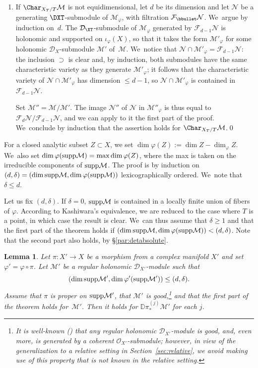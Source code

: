 \documentclass{amsart}
\theoremstyle{plain}
\numberwithin{theorem}{section}
\newtheorem{lemma}[theorem]{Lemma}
\theoremstyle{definition}
\theoremstyle{remark}
\theoremstyle{definition}
\newcommand{\D}{\mathbb{D}}
\newcommand{\cD}{\mathcal{D}}
\newcommand{\cF}{\mathcal{F}}
\newcommand{\cM}{\mathcal{M}}
\newcommand{\cN}{\mathcal{N}}
\newcommand{\cO}{\mathscr{O}}
\newcommand{\supp}{\textup{supp}}
\begin{document}
\begin{enumerate}
\item\label{par:detabsolute2}
If $\Char_{X_T/T}\cM$ is not equidimensional, let $d$ be its dimension and let $\cN$ be a generating $\DXT$-submodule of $\cM_\varphi$, with filtration $\cF_\bbullet\cN$. We~argue by induction on~$d$. The $\cD_{\XT}$-submodule of $\cM_\varphi$ generated by $\cF_{d-1}\cN$ is holonomic and supported on $\iota_\varphi(X)$, so that it takes the form $\cM'_\varphi$ for some holonomic $\cD_X$-submodule $\cM'$ of~$\cM$. We~notice that $\cN\cap\cM'_\varphi=\cF_{d-1}\cN$: the inclusion $\supset$ is clear and, by induction, both submodules have the same characteristic variety as they generate $\cM'_\varphi$; it follows that the characteristic variety of $\cN\cap\cM'_\varphi$ has dimension $\leq d-1$, so $\cN\cap\cM'_\varphi$ is contained in $\cF_{d-1}\cN$.

Set $\cM''=\cM/\cM'$. The image $\cN''$ of $\cN$ in $\cM''_\varphi$ is thus equal to $\cF_d\cN/\cF_{d-1}\cN$, and we can apply to it the first part of the proof. We~conclude by induction that the assertion holds for $\Char_{X_T/T}\cM$.\qed
\end{enumerate}

\label{par:pffirstpart}
For a closed analytic subset \hbox{$Z\!\subset\!X$}, we set $\dim\varphi(Z):=\dim Z-\dim_\varphi Z$. We~also set $\dim\varphi(\supp\cM)=\max\dim\varphi(Z)$, where the max is taken on the irreducible components of $\supp\cM$. The proof is by induction on $(d,\delta)=(\dim\supp\cM,\dim\varphi(\supp\cM))$ lexicographically ordered. We~note that $\delta\leq d$.

Let us fix $(d,\delta)$. If $\delta=0$, $\supp\cM$ is contained in a locally finite union of fibers of $\varphi$. According to Kashiwara's equivalence, we are reduced to the case where $T$ is a point, in which case the result is clear. We~can thus assume that $\delta\geq1$ and that the first part of the theorem holds if $(\dim\supp\cM,\dim\varphi(\supp\cM))<(d,\delta)$. Note that the second part also holds, by \S\ref{par:detabsolute}.

\begin{lemma}\label{lem:push}
Let $\pi:X'\to X$ be a morphism from a complex manifold $X'$ and set $\varphi'=\varphi\circ\pi$. Let $\cM'$ be a regular holonomic $\cD_{X'}$-module such that
\[
(\dim\supp\cM',\dim\varphi'(\supp\cM'))\leq(d,\delta).
\]
Assume that $\pi$ is proper on $\supp\cM'$, that $\cM'$ is good,\footnote{It is well-known (\cf\cite{Malgrange04}) that any regular holonomic $\cD_{X'}$-module is good, and, even more, is generated by a coherent $\cO_{X'}$-submodule; however, in view of the generalization to a relative setting in Section~\ref{sec:relative}, we avoid making use of this property that is not known in the relative setting.} and that the first part of the theorem holds for~$\cM'$. Then it holds for $\D\pi_*^{(j)}\cM'$ for each $j$. 
\end{lemma}
\end{document}
